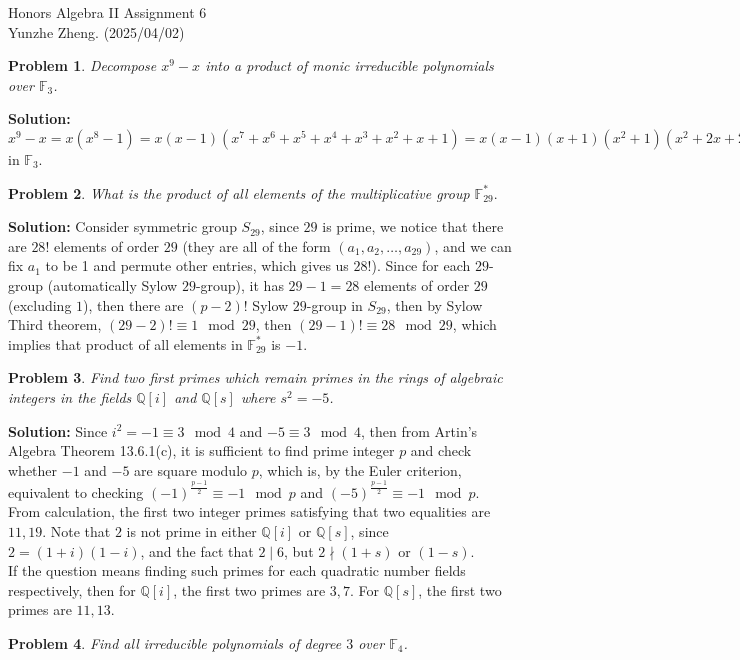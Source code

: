 \documentclass[12pt]{article}
\newtheorem{problem}{Problem}
\begin{document}
\noindent Honors Algebra II \hfill Assignment 6\\
Yunzhe Zheng. (2025/04/02)

\hrulefill

\begin{problem}
Decompose $x^9-x$ into a product of monic irreducible polynomials over $\mathbb{F}_{3}$.
\end{problem}

\textbf{Solution:} $x^9-x=x(x^8-1)=x(x-1)(x^7+x^6+x^5+x^4+x^3+x^2+x+1)=x(x-1)(x+1)(x^2+1)(x^2+2x+2)(x^2+x+2)$ in $\mathbb{F}_3$.
\\
\begin{problem}
What is the product of all elements of the multiplicative group $\mathbb{F}_{29}^{*}.$
\end{problem}

\textbf{Solution:} Consider symmetric group $S_{29}$, since $29$ is prime, we notice that there are $28!$ elements of order $29$ (they are all of the form $(a_{1}, a_{2}, \dots, a_{29})$, and we can fix $a_1$ to be 1 and permute other entries, which gives us $28!$). Since for each $29$-group (automatically Sylow $29$-group), it has $29-1=28$ elements of order $29$ (excluding $1$), then there are $(p-2)!$ Sylow $29$-group in $S_{29}$, then by Sylow Third theorem, $(29-2)!\equiv 1\mod 29$, then $(29-1)!\equiv 28\mod 29$, which implies that product of all elements in $\mathbb{F}_{29}^*$ is $-1$.
\\
\begin{problem}
Find two first primes which remain primes in the rings of algebraic integers in the fields $\mathbb{Q}[i]$ and $\mathbb{Q}[s]$ where $s^2=-5$. 
\end{problem}

\textbf{Solution:} Since $i^2=-1\equiv 3\mod 4$ and $-5\equiv 3\mod 4$, then from Artin's Algebra Theorem 13.6.1(c), it is sufficient to find prime integer $p$ and check whether $-1$ and $-5$ are square modulo $p$, which is, by the Euler criterion, equivalent to checking $(-1)^{\frac{p-1}{2}}\equiv -1\mod p$ and $(-5)^{\frac{p-1}{2}}\equiv -1\mod p$. From calculation, the first two integer primes satisfying that two equalities are $11, 19$. Note that $2$ is not prime in either $\mathbb{Q}[i]$ or $\mathbb{Q}[s]$, since $2=(1+i)(1-i)$, and the fact that $2\mid6$, but $2\nmid (1+s)$ or $(1-s)$. \\
\indent If the question means finding such primes for each quadratic number fields respectively, then for $\mathbb{Q}[i]$, the first two primes are $3, 7$. For $\mathbb{Q}[s]$, the first two primes are $11, 13$.
\\
\begin{problem}
Find all irreducible polynomials of degree $3$ over $\mathbb{F}_4$.
\end{problem}
\end{document}
